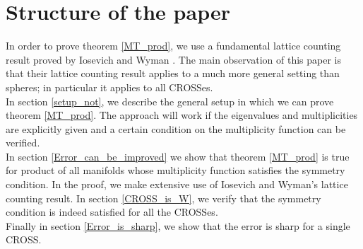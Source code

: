 \documentclass[11pt,lettersize,reqno,fullpage]{amsart}
\providecommand \hf{\hspace*{0.5cm}}
\begin{document}
\section{Structure of the paper} 
In order to prove theorem \ref{MT_prod}, we use a fundamental 
lattice counting result proved by Iosevich and Wyman 
\cite[page 597, theorem 1.8]{Weyl_Wyman_Iosevich}. 
The main observation of this paper is that their lattice counting result   
applies to a much more general setting than spheres; in particular it applies to all CROSSes. \\   
\hf \hf In section \ref{setup_not}, we describe the general setup in which we can prove  
theorem \ref{MT_prod}. The approach will work if the eigenvalues and multiplicities are explicitly given  
and a certain condition on the multiplicity function can be verified. \\ 
\hf \hf In section \ref{Error_can_be_improved} we show that 
theorem \ref{MT_prod} is true for product of all manifolds whose multiplicity function satisfies the symmetry condition. 
In the proof, we make extensive use of Iosevich and Wyman's lattice counting result. 
In section \ref{CROSS_is_W}, 
we verify that the symmetry condition is indeed satisfied for all the CROSSes. \\ 
\hf \hf Finally in section \ref{Error_is_sharp}, we show that the error is sharp for a single CROSS. 
 
\end{document}
